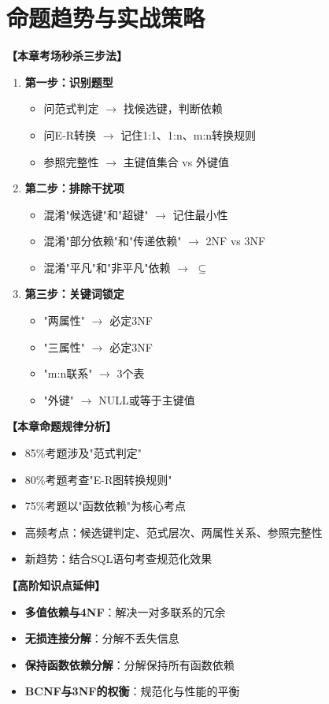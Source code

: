 \documentclass[12pt, a4paper]{article}
\newenvironment{bluebox}[1]{%
  \begin{trivlist}
  \item[\hskip\labelsep \textbf{#1}]
  \setlength{\parskip}{0.5ex}
  \setlength{\itemsep}{0.5ex}
}{%
  \end{trivlist}
  }
\begin{document}
\section{命题趋势与实战策略}

\begin{bluebox}{考场秒杀三步法}
	\textbf{【本章考场秒杀三步法】}

	\begin{enumerate}
		\item \textbf{第一步：识别题型}
		      \begin{itemize}[nosep]
			      \item 问范式判定 $\to$ 找候选键，判断依赖
			      \item 问E-R转换 $\to$ 记住1:1、1:n、m:n转换规则
			      \item 参照完整性 $\to$ 主键值集合 vs 外键值
		      \end{itemize}

		\item \textbf{第二步：排除干扰项}
		      \begin{itemize}[nosep]
			      \item 混淆"候选键"和"超键" $\to$ 记住最小性
			      \item 混淆"部分依赖"和"传递依赖" $\to$ 2NF vs 3NF
			      \item 混淆"平凡"和"非平凡"依赖 $\to$ $\subseteq$
		      \end{itemize}

		\item \textbf{第三步：关键词锁定}
		      \begin{itemize}[nosep]
			      \item "两属性" $\to$ 必定3NF
			      \item "三属性" $\to$ 必定3NF
			      \item "m:n联系" $\to$ 3个表
			      \item "外键" $\to$ NULL或等于主键值
		      \end{itemize}
	\end{enumerate}
\end{bluebox}

\begin{bluebox}{近年真题规律}
	\textbf{【本章命题规律分析】}

	\begin{itemize}
		\item 85\%考题涉及"范式判定"
		\item 80\%考题考查"E-R图转换规则"
		\item 75\%考题以"函数依赖"为核心考点
		\item 高频考点：候选键判定、范式层次、两属性关系、参照完整性
		\item 新趋势：结合SQL语句考查规范化效果
	\end{itemize}
\end{bluebox}

\begin{bluebox}{高阶延伸（冲击满分）}
	\textbf{【高阶知识点延伸】}

	\begin{itemize}
		\item \textbf{多值依赖与4NF}：解决一对多联系的冗余
		\item \textbf{无损连接分解}：分解不丢失信息
		\item \textbf{保持函数依赖分解}：分解保持所有函数依赖
		\item \textbf{BCNF与3NF的权衡}：规范化与性能的平衡
	\end{itemize}
\end{bluebox}
\end{document}
